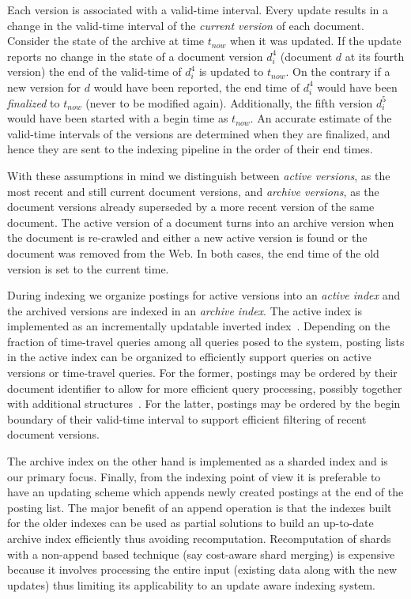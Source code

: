 Each version is associated with a valid-time interval. Every update results in a change in the valid-time interval of the \emph{ current version} of each document. Consider the state of the archive at time $t_{now}$ when it was updated. If the update reports no change in the state of a document version $d_i^4$ (document $d$ at its fourth version) the end of the valid-time of $d_i^4$ is updated to $t_{now}$. On the contrary if a new version for $d$ would have been reported, the end time of $d_i^4$ would have been \emph{finalized} to $t_{now}$ (never to be modified again). Additionally, the fifth version $d_i^5$ would have been started with a begin time as $t_{now}$. An accurate estimate of the valid-time intervals of the versions are determined when they are finalized, and hence they are sent to the indexing pipeline in the order of their end times. 

With these assumptions in mind we distinguish between \textit{active versions}, as the
most recent and still current document versions, and \textit{archive versions}, as the document versions already superseded by a more
recent version of the same document. The active version of a document turns into an archive version when the document is re-crawled and either a new active version is found or the document was removed from the Web. In both cases, the end time of the old version is set to the current time.

During indexing we organize postings for active versions into an \emph{active index} and the archived versions are indexed in an \emph{archive index}. The active index is implemented as an incrementally updatable inverted index~\cite{Buttcher:2008fk,Lester:2008qf}. Depending on the fraction of time-travel queries among all queries posed to the system, posting lists in the active index can be organized to efficiently support queries on active versions or time-travel queries. For the former, postings may be ordered by their document identifier to allow for more efficient query processing, possibly together with additional
structures~\cite{DBLP:conf/cikm/BroderCHSZ03,DBLP:conf/sigir/DingS11,DBLP:journals/tois/MoffatZ96,DBLP:conf/sigir/StrohmanC07}. For
the latter, postings may be ordered by the begin boundary of
their valid-time interval to support efficient filtering of recent
document versions. 

The archive index on the other hand is implemented as a sharded index and is our primary focus. Finally, from the indexing point of view it is preferable to have an updating scheme which appends newly created postings at the end of the posting list. The major benefit of an append operation is that the indexes built for the older indexes can be used as partial solutions to build an up-to-date archive index efficiently thus avoiding recomputation. Recomputation of shards with a non-append based technique (say cost-aware shard merging) is expensive because it involves processing the entire input (existing data along with the new updates) thus limiting its applicability to an update aware indexing system. 

